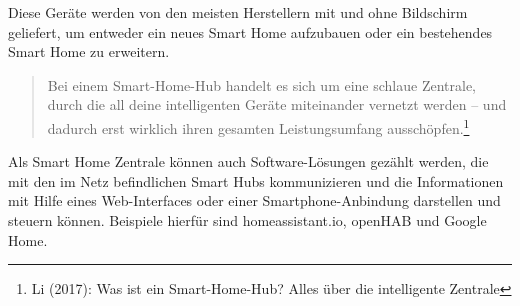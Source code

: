  	Diese Geräte werden von den meisten Herstellern mit und ohne Bildschirm geliefert, um entweder ein neues Smart Home aufzubauen oder ein bestehendes Smart Home zu erweitern. 
 	\begin{quote}
 	\color{quotetext}
 		Bei einem Smart-Home-Hub handelt es sich um eine schlaue Zentrale, durch die all deine intelligenten Geräte miteinander vernetzt werden – und dadurch erst wirklich ihren gesamten Leistungsumfang ausschöpfen.\footnote{Li (2017): Was ist ein Smart-Home-Hub? Alles über die intelligente Zentrale}
 	\end{quote}
Als Smart Home Zentrale können auch Software-Lösungen gezählt werden, die mit den im Netz befindlichen Smart Hubs kommunizieren und die Informationen mit Hilfe eines Web-Interfaces oder einer Smartphone-Anbindung darstellen und steuern können. Beispiele hierfür sind homeassistant.io, openHAB und Google Home.\par
 	\newpage
